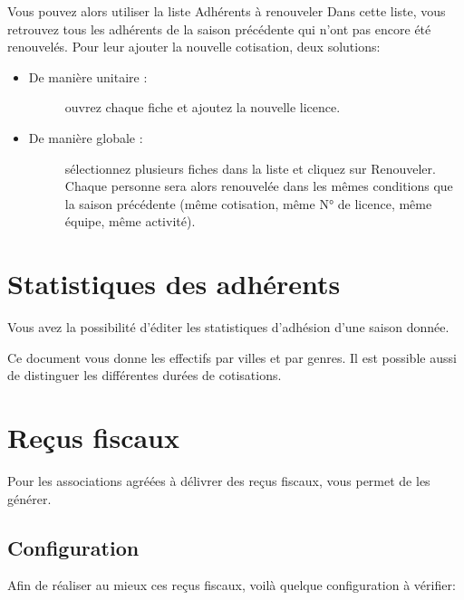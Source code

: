 \documentclass[a4paper,10pt,oneside,french]{sphinxmanual}
\begin{document}
Vous pouvez alors utiliser la liste Adhérents à renouveler
Dans cette liste, vous retrouvez tous les adhérents de la saison précédente qui n’ont pas encore été renouvelés.
Pour leur ajouter la nouvelle cotisation, deux solutions:
\begin{itemize}
\item {} \begin{description}
\item[{De manière unitaire :}] \leavevmode
ouvrez chaque fiche et ajoutez la nouvelle licence.

\end{description}

\item {} \begin{description}
\item[{De manière globale :}] \leavevmode
sélectionnez plusieurs fiches dans la liste et cliquez sur Renouveler. Chaque personne sera alors renouvelée dans les mêmes conditions que la saison précédente (même cotisation, même N° de licence, même équipe, même activité).

\end{description}

\end{itemize}


\section{Statistiques des adhérents}
\label{\detokenize{member/statistic:statistiques-des-adherents}}\label{\detokenize{member/statistic::doc}}
\noindent{}

Vous avez la possibilité d’éditer les statistiques d’adhésion d’une saison donnée.

Ce document vous donne les effectifs par villes et par genres. Il est possible aussi de distinguer les différentes durées de cotisations.


\section{Reçus fiscaux}
\label{\detokenize{member/taxreceipt:recus-fiscaux}}\label{\detokenize{member/taxreceipt::doc}}
Pour les associations agréées à délivrer des reçus fiscaux,  vous permet de les générer.


\subsection{Configuration}
\label{\detokenize{member/taxreceipt:configuration}}
Afin de réaliser au mieux ces reçus fiscaux, voilà quelque configuration à vérifier:
\end{document}
